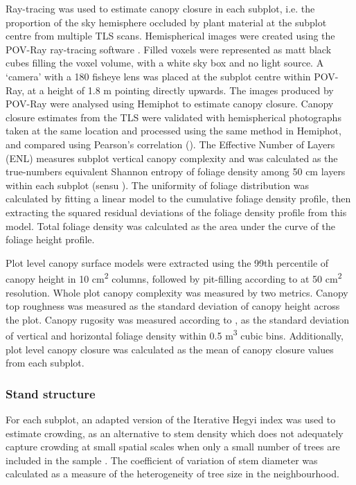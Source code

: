 \documentclass[11pt,a4paper]{article}
\begin{document}
Ray-tracing was used to estimate canopy closure in each subplot, i.e. the proportion of the sky hemisphere occluded by plant material at the subplot centre from multiple TLS scans. Hemispherical images were created using the POV-Ray ray-tracing software \citep{Povray2004}. Filled voxels were represented as matt black cubes filling the voxel volume, with a white sky box and no light source. A `camera' with a 180\textdegree{} fisheye lens was placed at the subplot centre within POV-Ray, at a height of 1.8 m pointing directly upwards. The images produced by POV-Ray were analysed using Hemiphot \citep{HemiPhot} to estimate canopy closure. Canopy closure estimates from the TLS were validated with hemispherical photographs taken at the same location and processed using the same method in Hemiphot, and compared using Pearson's correlation (\hemiCor{}). The Effective Number of Layers (ENL) measures subplot vertical canopy complexity and was calculated as the true-numbers equivalent Shannon entropy of foliage density among 50 cm layers within each subplot (sensu \citealt{Ehbrecht2016}). The uniformity of foliage distribution was calculated by fitting a linear model to the cumulative foliage density profile, then extracting the squared residual deviations of the foliage density profile from this model. Total foliage density was calculated as the area under the curve of the foliage height profile. 

Plot level canopy surface models were extracted using the 99th percentile of canopy height in 10 cm\textsuperscript{2} columns, followed by pit-filling according to \citet{Khosravipour2014} at 50 cm\textsuperscript{2} resolution. Whole plot canopy complexity was measured by two metrics. Canopy top roughness was measured as the standard deviation of canopy height across the plot. Canopy rugosity was measured according to \citet{Hardiman2011}, as the standard deviation of vertical and horizontal foliage density within 0.5 m\textsuperscript{3} cubic bins. Additionally, plot level canopy closure was calculated as the mean of canopy closure values from each subplot.

\subsubsection{Stand structure}

For each subplot, an adapted version of the Iterative Hegyi index was used to estimate crowding, as an alternative to stem density which does not adequately capture crowding at small spatial scales when only a small number of trees are included in the sample \citep{Hegyi1974}. The coefficient of variation of stem diameter was calculated as a measure of the heterogeneity of tree size in the neighbourhood. 
\end{document}
